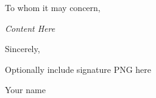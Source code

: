 \documentclass[11pt]{mcgill_letter}
\date{\vspace*{1cm} \raggedright \today\vspace*{-1cm}}
\begin{document}
	


\begin{letter}{}

\opening{To whom it may concern,}

\textit{Content Here}



\hfill
Sincerely,

\hfill
Optionally include signature PNG here

\hfill
Your name

\end{letter}
\end{document}

